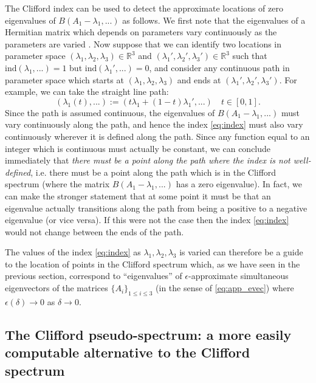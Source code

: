 \documentclass[a4paper]{article}
\begin{document}
The Clifford index can be used to detect the approximate locations of zero eigenvalues of $B(A_1 - \lambda_1,...)$ as follows. We first note that the eigenvalues of a Hermitian matrix which depends on parameters vary continuously as the parameters are varied \cite{need ref}. Now suppose that we can identify two locations in parameter space $(\lambda_1,\lambda_2,\lambda_3) \in \mathbb{R}^3$ and $(\lambda_1',\lambda_2',\lambda_3') \in \mathbb{R}^3$ such that $\text{ind}(\lambda_1,...) = 1$ but $\text{ind}(\lambda_1',...) = 0$, and consider any continuous path in parameter space which starts at $(\lambda_1,\lambda_2,\lambda_3)$ and ends at $(\lambda_1',\lambda_2',\lambda_3')$. For example, we can take the straight line path:
\begin{equation}
	\left(\lambda_1(t),...\right) := \left(t \lambda_1 + (1 - t) \lambda_1',...\right) \quad t \in [0,1].
\end{equation}
Since the path is assumed continuous, the eigenvalues of $B(A_1 - \lambda_1,...)$ must vary continuously along the path, and hence the index \eqref{eq:index} must also vary continuously wherever it is defined along the path. Since any function equal to an integer which is continuous must actually be constant, we can conclude immediately that \emph{there must be a point along the path where the index is not well-defined}, i.e. there must be a point along the path which is in the Clifford spectrum (where the matrix $B(A_1 - \lambda_1,...)$ has a zero eigenvalue). In fact, we can make the stronger statement that at some point it must be that an eigenvalue actually transitions along the path from being a positive to a negative eigenvalue (or vice versa). If this were not the case then the index \eqref{eq:index} would not change between the ends of the path. 

The values of the index \eqref{eq:index} as $\lambda_1, \lambda_2, \lambda_3$ is varied can therefore be a guide to the location of points in the Clifford spectrum which, as we have seen in the previous section, correspond to ``eigenvalues'' of $\epsilon$-approximate simultaneous eigenvectors of the matrices $\{ A_i \}_{1 \leq i \leq 3}$ (in the sense of \eqref{eq:app_evec}) where $\epsilon(\delta) \rightarrow 0$ as $\delta \rightarrow 0$.

\subsection{The Clifford pseudo-spectrum: a more easily computable alternative to the Clifford spectrum}
\end{document}
